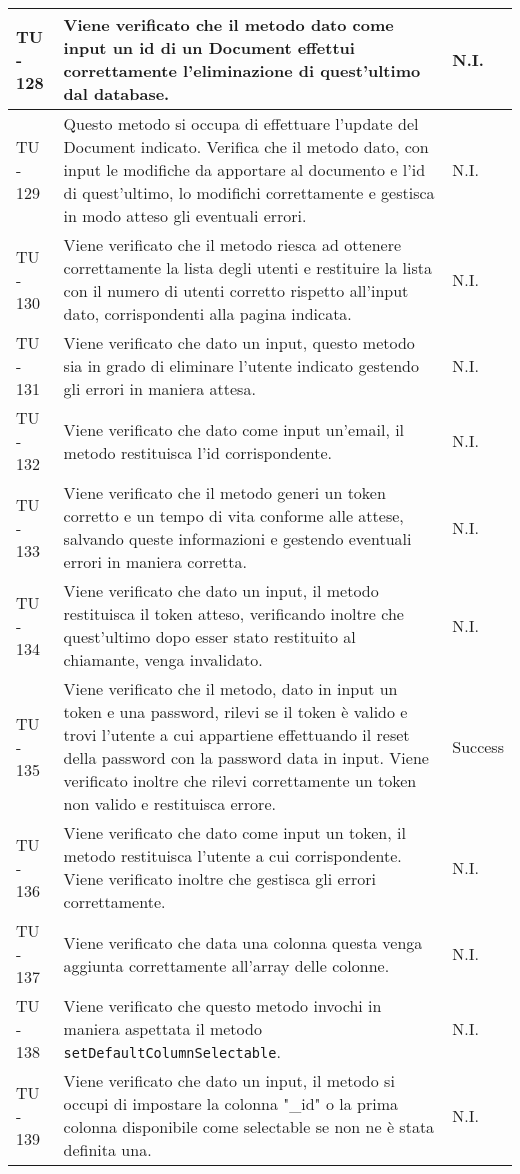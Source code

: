 \begin{center}
\begin{longtable}{ | p{3cm} | p{9cm} | p{2cm} | }
TU - 128 & Viene verificato che il metodo dato come input un id di un Document effettui correttamente l'eliminazione di quest'ultimo dal database. & N.I. \\ \hline
TU - 129 & Questo metodo si occupa di effettuare l'update del Document indicato.
Verifica che il metodo dato, con input le modifiche da apportare al documento e l'id di quest'ultimo, lo modifichi correttamente e gestisca in modo atteso gli eventuali errori. & N.I. \\ \hline
TU - 130 & Viene verificato che il metodo riesca ad ottenere correttamente la lista degli utenti e restituire la lista con il numero di utenti corretto rispetto all'input dato, corrispondenti alla pagina indicata. & N.I. \\ \hline
TU - 131 & Viene verificato che dato un input, questo metodo sia in grado di eliminare l'utente indicato gestendo gli errori in maniera attesa. & N.I. \\ \hline
TU - 132 & Viene verificato che dato come input un'email, il metodo restituisca l'id corrispondente. & N.I. \\ \hline
TU - 133 & Viene verificato che il metodo generi un token corretto e un tempo di vita conforme alle attese, salvando queste informazioni e gestendo eventuali errori in maniera corretta. & N.I. \\ \hline
TU - 134 & Viene verificato che dato un input, il metodo restituisca il token atteso, verificando inoltre che quest'ultimo dopo esser stato restituito al chiamante, venga invalidato.
 & N.I. \\ \hline
TU - 135 & Viene verificato che il metodo, dato in input un token e una password, rilevi se il token è valido e trovi l'utente a cui appartiene effettuando il reset della password con la password data in input.
Viene verificato inoltre che rilevi correttamente un token non valido e restituisca errore. & Success \\ \hline
TU - 136 & Viene verificato che dato come input un token, il metodo restituisca l'utente a cui corrispondente.
Viene verificato inoltre che gestisca gli errori correttamente. & N.I. \\ \hline
TU - 137 & Viene verificato che data una colonna questa venga aggiunta correttamente all'array delle colonne. & N.I. \\ \hline
TU - 138 & Viene verificato che questo metodo invochi in maniera aspettata il metodo \texttt{setDefaultColumnSelectable}. & N.I. \\ \hline
TU - 139 & Viene verificato che dato un input, il metodo si occupi di impostare la colonna "\_id" o la prima colonna disponibile come selectable se non ne è stata definita una. & N.I. \\ \hline

\end{longtable}
\end{center}
